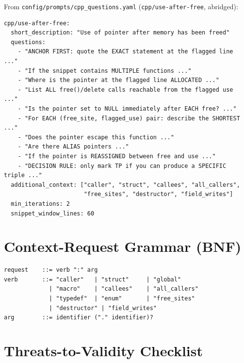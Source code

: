 \documentclass[11pt,a4paper]{article}
\begin{document}
From \texttt{config/prompts/cpp\_questions.yaml}
(\texttt{cpp/use-after-free}, abridged):

\begin{lstlisting}[language=yamlex]
cpp/use-after-free:
  short_description: "Use of pointer after memory has been freed"
  questions:
    - "ANCHOR FIRST: quote the EXACT statement at the flagged line ..."
    - "If the snippet contains MULTIPLE functions ..."
    - "Where is the pointer at the flagged line ALLOCATED ..."
    - "List ALL free()/delete calls reachable from the flagged use ..."
    - "Is the pointer set to NULL immediately after EACH free? ..."
    - "For EACH (free_site, flagged_use) pair: describe the SHORTEST ..."
    - "Does the pointer escape this function ..."
    - "Are there ALIAS pointers ..."
    - "If the pointer is REASSIGNED between free and use ..."
    - "DECISION RULE: only mark TP if you can produce a SPECIFIC triple ..."
  additional_context: ["caller", "struct", "callees", "all_callers",
                       "free_sites", "destructor", "field_writes"]
  min_iterations: 2
  snippet_window_lines: 60
\end{lstlisting}

\section{Context-Request Grammar (BNF)}
\label{app:bnf}

\begin{lstlisting}[language={}]
request    ::= verb ":" arg
verb       ::= "caller"   | "struct"     | "global"
             | "macro"    | "callees"    | "all_callers"
             | "typedef"  | "enum"       | "free_sites"
             | "destructor" | "field_writes"
arg        ::= identifier ("." identifier)?
\end{lstlisting}

\section{Threats-to-Validity Checklist}
\label{sec:tov-checklist}
\end{document}
